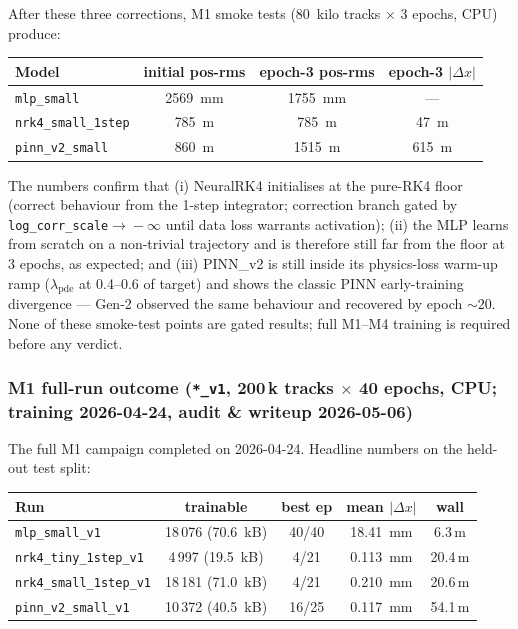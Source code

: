 \documentclass[a4paper,11pt]{article}
\newcommand{\SI}[2]{#1~#2}
\newcommand{\kilo}{k}
\newcommand{\byte}{B}
\newcommand{\mm}{mm}
\begin{document}
\noindent After these three corrections, M1 smoke tests
(\SI{80}{kilo} tracks $\times$ 3 epochs, CPU) produce:

\begin{center}
\small
\begin{tabular}{lccc}
\toprule
Model & initial pos-rms & epoch-3 pos-rms & epoch-3 $|\Delta x|$ \\
\midrule
\texttt{mlp\_small}             & \SI{2569}{mm}  & \SI{1755}{mm}   & --- \\
\texttt{nrk4\_small\_1step}     & \SI{785}{\mu m}& \SI{785}{\mu m} & \SI{47}{\mu m} \\
\texttt{pinn\_v2\_small}        & \SI{860}{\mu m}& \SI{1515}{\mu m}& \SI{615}{\mu m} \\
\bottomrule
\end{tabular}
\end{center}

\noindent The numbers confirm that (i) NeuralRK4 initialises at the
pure-RK4 floor (correct behaviour from the 1-step integrator;
correction branch gated by \texttt{log\_corr\_scale$\to\!-\infty$}
until data loss warrants activation); (ii) the MLP learns from
scratch on a non-trivial trajectory and is therefore still far from
the floor at 3 epochs, as expected; and (iii) PINN\_v2 is still
inside its physics-loss warm-up ramp ($\lambda_\mathrm{pde}$ at
0.4--0.6 of target) and shows the classic PINN early-training
divergence --- Gen-2 observed the same behaviour and recovered by
epoch $\sim 20$.  None of these smoke-test points are gated
results; full M1--M4 training is required before any verdict.

\subsubsection{M1 full-run outcome (\texttt{*\_v1}, 200\,k tracks
$\times$ 40 epochs, CPU; training 2026-04-24, audit \& writeup
2026-05-06)}
\label{gen3:sec:m1_v1_outcome}

The full M1 campaign completed on 2026-04-24.  Headline numbers
on the held-out test split:

\begin{center}
\small
\begin{tabular}{lcccc}
\toprule
Run & trainable & best ep & mean $|\Delta x|$ & wall \\
\midrule
\texttt{mlp\_small\_v1}        & 18\,076 (\SI{70.6}{\kilo\byte}) & 40/40 & \SI{18.41}{\mm}    & 6.3\,m \\
\texttt{nrk4\_tiny\_1step\_v1} &  4\,997 (\SI{19.5}{\kilo\byte}) &  4/21 & \SI{0.113}{\mm}     & 20.4\,m \\
\texttt{nrk4\_small\_1step\_v1}& 18\,181 (\SI{71.0}{\kilo\byte}) &  4/21 & \SI{0.210}{\mm}     & 20.6\,m \\
\texttt{pinn\_v2\_small\_v1}   & 10\,372 (\SI{40.5}{\kilo\byte}) & 16/25 & \SI{0.117}{\mm}     & 54.1\,m \\
\bottomrule
\end{tabular}
\end{center}
\end{document}
